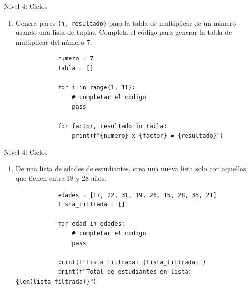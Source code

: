 \documentclass{beamer}
\begin{document}
    \begin{frame}[fragile, t]{Nivel 4: Ciclos}
        \begin{enumerate}
            \item[14.]Genera pares \texttt{(n, resultado)} para la tabla de multiplicar de un número 
            usando una lista de tuplas. Completa el código para generar la tabla de multiplicar del número 7.
            \begin{verbatim}
            numero = 7
            tabla = []
            
            for i in range(1, 11):
                # completar el codigo
                pass
            
            for factor, resultado in tabla:
                print(f"{numero} x {factor} = {resultado}")
            \end{verbatim}
        \end{enumerate}
    \end{frame}

    \begin{frame}[fragile, t]{Nivel 4: Ciclos}
        \begin{enumerate}
            \item[15.] De una lista de edades de estudiantes, crea una nueva lista solo con aquellos que tienen entre 18 y 28 años.
            \begin{verbatim}
            edades = [17, 22, 31, 19, 26, 15, 28, 35, 21]
            lista_filtrada = []
            
            for edad in edades:
                # completar el codigo
                pass
            
            print(f"Lista filtrada: {lista_filtrada}")
            print(f"Total de estudiantes en lista: {len(lista_filtrada)}")
            \end{verbatim}
        \end{enumerate}
    \end{frame}
    
\end{document}
